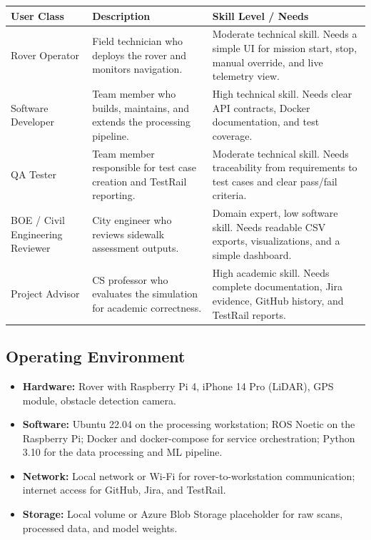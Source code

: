 \documentclass{article}
\begin{document}
\begin{longtable}{|p{1.5in}|p{2in}|p{2.5in}|}
\hline
\textbf{User Class} & \textbf{Description} & \textbf{Skill Level / Needs} \\
\hline
Rover Operator & Field technician who deploys the rover and monitors navigation. &
  Moderate technical skill. Needs a simple UI for mission start, stop, manual override, and live
  telemetry view. \\
\hline
Software Developer & Team member who builds, maintains, and extends the processing pipeline. &
  High technical skill. Needs clear API contracts, Docker documentation, and test coverage. \\
\hline
QA Tester & Team member responsible for test case creation and TestRail reporting. &
  Moderate technical skill. Needs traceability from requirements to test cases and clear pass/fail
  criteria. \\
\hline
BOE / Civil Engineering Reviewer & City engineer who reviews sidewalk assessment outputs. &
  Domain expert, low software skill. Needs readable CSV exports, visualizations, and a simple
  dashboard. \\
\hline
Project Advisor & CS professor who evaluates the simulation for academic correctness. &
  High academic skill. Needs complete documentation, Jira evidence, GitHub history, and TestRail
  reports. \\
\hline
\end{longtable}

\subsection{Operating Environment}
\begin{itemize}
  \item \textbf{Hardware:} Rover with Raspberry Pi 4, iPhone 14 Pro (LiDAR), GPS module, obstacle
    detection camera.
  \item \textbf{Software:} Ubuntu 22.04 on the processing workstation; ROS Noetic on the
    Raspberry Pi; Docker and docker-compose for service orchestration; Python 3.10 for the data
    processing and ML pipeline.
  \item \textbf{Network:} Local network or Wi-Fi for rover-to-workstation communication;
    internet access for GitHub, Jira, and TestRail.
  \item \textbf{Storage:} Local volume or Azure Blob Storage placeholder for raw scans,
    processed data, and model weights.
\end{itemize}
\end{document}
